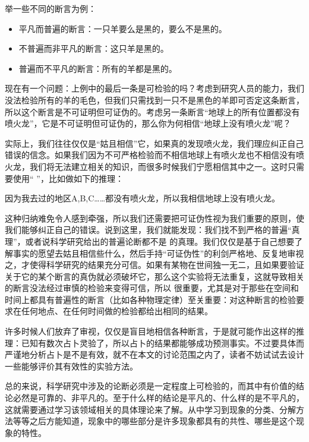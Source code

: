 \documentclass[a4paper,10pt,english]{sphinxmanual}
\begin{document}
举一些不同的断言为例：
\begin{itemize}
\item {} 
平凡而普遍的断言：一只羊要么是黑的，要么不是黑的。

\item {} 
不普遍而非平凡的断言：这只羊是黑的。

\item {} 
普遍而不平凡的断言：所有的羊都是黑的。

\end{itemize}

现在有一个问题：上例中的最后一条是可检验的吗？考虑到研究人员的能力，我们没法检验所有的羊的毛色，但我们只需找到一只不是黑色的羊即可否定这条断言，所以这个断言是不可证明但可证伪的。考虑另一条断言“地球上的所有位置都没有喷火龙”，它是不可证明但可证伪的，那么你为何相信“地球上没有喷火龙”呢？

实际上，我们往往仅仅是“姑且相信”它，如果真的发现喷火龙，我们理应纠正自己错误的信念。如果我们因为不可严格检验而不相信地球上有喷火龙也不相信没有喷火龙，我们将无法建立相关的知识，而很多时候我们宁愿相信其中之一。这时只需要使用“  ”，比如做如下的推理：

因为我去过的地区A,B,C……都没有喷火龙，所以我相信地球上没有喷火龙。

这种归纳难免令人感到牵强，所以我们还需要把可证伪性视为我们重要的原则，使我们能够纠正自己的错误。说到这里，我们就能发现：我们找不到严格的普遍“真理”，或者说科学研究给出的普遍论断都不是  的真理。我们仅仅是基于自己想要了解事实的愿望去姑且相信些什么，然后手持“可证伪性”的利剑严格地、反复地审视之，才使得科学研究的结果充分可信。如果有某物在世间独一无二，且如果要验证关于它的某个断言的真伪就必须破坏它，那么这个实验将无法重复，这就导致相关的断言没法经过审慎的检验来变得可信，所以  很重要，尤其是对于那些在空间和时间上都具有普遍性的断言（比如各种物理定律）至关重要：对这种断言的检验要求在任何地点、在任何时间做的检验都给出相同的结果。

许多时候人们放弃了审视，仅仅是盲目地相信各种断言，于是就可能作出这样的推理：已知有数次占卜灵验了，所以占卜的结果都能够成功预测事实。不过要具体而严谨地分析占卜是不是有效，就不在本文的讨论范围之内了，读者不妨试试去设计一些能够评价其有效性的实验方法。

总的来说，科学研究中涉及的论断必须是一定程度上可检验的，而其中有价值的结论必然是可靠的、非平凡的。至于什么样的结论是平凡的、什么样的是不平凡的，这就需要通过学习该领域相关的具体理论来了解。从中学习到现象的分类、分解方法等等之后方能知道，现象中的哪些部分是许多现象都具有的共性、哪些是这个现象的特性。
\end{document}
